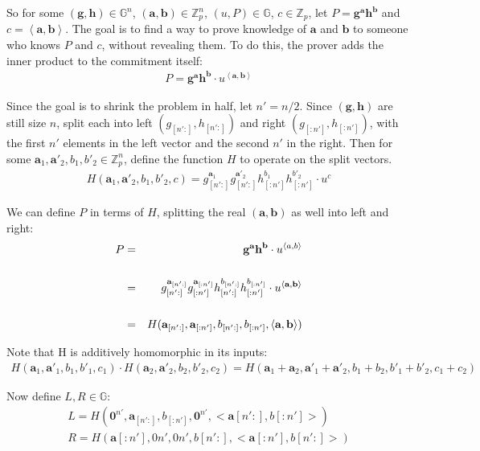 \documentclass{article}
\begin{document}
So for some $(\textbf{g}, \textbf{h}) \in \mathbb{G}^n$, $(\textbf{a}, \textbf{b}) \in \mathbb{Z}_p^n$, $(u, P) \in \mathbb{G}$, $c \in \mathbb{Z}_p$, let $P = \textbf{g}^\textbf{a} \textbf{h}^\textbf{b}$ and $c = \left<\textbf{a}, \textbf{b}\right>$.  The goal is to find a way to prove knowledge of $\textbf{a}$ and $\textbf{b}$ to someone who knows $P$ and $c$, without revealing them.  To do this, the prover adds the inner product to the commitment itself:
\begin{eqnarray}
  P = \textbf{g}^\textbf{a} \textbf{h}^\textbf{b} \cdot u^{\left<\textbf{a}, \textbf{b}\right>}
\end{eqnarray}

Since the goal is to shrink the problem in half, let $n' = n/2$.  Since $(\textbf{g}, \textbf{h})$ are still size $n$, split each into left $(g_{[n':]}, h_{[n':]})$ and right $(g_{[:n']}, h_{[:n']})$, with the first $n'$ elements in the left vector and the second $n'$ in the right.  Then for some $\textbf{a}_1, \textbf{a}'_2, b_1, b'_2 \in \mathbb{Z}_p^n$, define the function $H$ to operate on the split vectors. 
\begin{eqnarray}
  H(\textbf{a}_1, \textbf{a}'_2, b_1, b'_2, c) = g_{[n':]}^{\textbf{a}_1} g_{[n':]}^{\textbf{a}'_2} h_{[:n']}^{b_1} h_{[:n']}^{b'_2} \cdot u^c
\end{eqnarray}

We can define $P$ in terms of $H$, splitting the real $(\textbf{a}, \textbf{b})$ as well into left and right:
\begin{eqnarray}
  P &=& \textbf{g}^{\textbf{a}} \textbf{h}^{\textbf{b}} \cdot u^{\left<a, b\right>}\\
  \cr &=& g_{[n':]}^{\textbf{a}_{[n':]}} g_{[:n']}^{\textbf{a}_{[:n']}} h_{[n':]}^{b_{[n':]}} h_{[:n']}^{b_{[:n']}} \cdot u^{\left<\textbf{a}, \textbf{b}\right>}\\
  \cr &=& H(\textbf{a}_{[n':]}, \textbf{a}_{[:n']}, b_{[n':]}, b_{[:n']}, \left<\textbf{a}, \textbf{b}\right>)
\end{eqnarray}

Note that H is additively homomorphic in its inputs:
\begin{eqnarray}
  H(\textbf{a}_1, \textbf{a}'_1, b_1, b'_1, c_1) \cdot H(\textbf{a}_2, \textbf{a}'_2, b_2, b'_2, c_2) = H(\textbf{a}_1 + \textbf{a}_2, \textbf{a}'_1 + \textbf{a}'_2, b_1 + b_2, b'_1 + b'_2, c_1 + c_2)
\end{eqnarray}

Now define $L, R \in \mathbb{G}$:
\begin{eqnarray}
  L = H(\textbf{0}^{n'}, \textbf{a}_{[n':]}, b_{[:n']}, \textbf{0}^{n'}, <\textbf{a}{[n':]}, b{[:n']}>)\\
  R = H(\textbf{a}{[:n']}, 0n', 0n', b{[n':]}, <\textbf{a}{[:n']}, b{[n':]}>)
\end{eqnarray}
\end{document}
